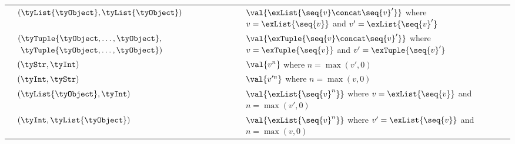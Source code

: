 \begin{tabular}{>{\raggedright\arraybackslash}p{}>{\raggedright\arraybackslash}p{}>{\raggedright\arraybackslash}p{}}
\pyinline{+} & $(\tyList{\tyObject}, \tyList{\tyObject})$ & $\val{\exList{\seq{v} \concat \seq{v}'}}$ where $v = \exList{\seq{v}}$ and $v' = \exList{\seq{v}'}$ \\
\pyinline{+} & $(\tyTuple{\tyObject, \ldots, \tyObject},$\newline$\phantom{(}\tyTuple{\tyObject, \ldots, \tyObject})$ & $\val{\exTuple{\seq{v} \concat \seq{v}'}}$ where $v = \exTuple{\seq{v}}$ and $v' = \exTuple{\seq{v}'}$ \\
\pyinline{*} & $(\tyStr, \tyInt)$ & $\val{v^n}$ where $n = \max(v', 0)$ \\
\pyinline{*} & $(\tyInt, \tyStr)$ & $\val{v'^n}$ where $n = \max(v, 0)$ \\
\pyinline{*} & $(\tyList{\tyObject}, \tyInt)$ & $\val{\exList{\seq{v}^n}}$ where $v = \exList{\seq{v}}$ and $n = \max(v', 0)$ \\
\pyinline{*} & $(\tyInt, \tyList{\tyObject})$ & $\val{\exList{\seq{v}^n}}$ where $v' = \exList{\seq{v}}$ and $n = \max(v, 0)$
\end{tabular}
